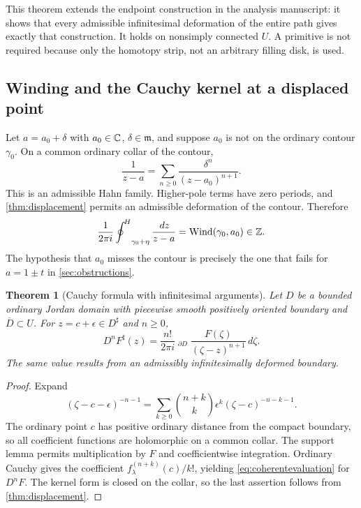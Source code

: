 \documentclass[11pt,letterpaper]{article}
\newtheorem{theorem}{Theorem}[section]
\theoremstyle{definition}
\theoremstyle{remark}
\newcommand{\m}{\mathfrak m}\newcommand{\st}{\operatorname{st}}
\newcommand{\HCoint}{\mathop{\oint^{\!H}}\nolimits}
\newcommand{\sh}{^{\sharp}}\newcommand{\dd}{\,d}
\numberwithin{equation}{section}
\begin{document}
This theorem extends the endpoint construction in the analysis manuscript: it shows that every admissible infinitesimal deformation of the entire path gives exactly that construction. It holds on nonsimply connected $U$. A primitive is not required because only the homotopy strip, not an arbitrary filling disk, is used.

\subsection{Winding and the Cauchy kernel at a displaced point}
Let $a=a_0+\delta$ with $a_0\in\mathbb C$, $\delta\in\m$, and suppose $a_0$ is not on the ordinary contour $\gamma_0$. On a common ordinary collar of the contour,
\[
 \frac1{z-a}=\sum_{n\ge0}\frac{\delta^n}{(z-a_0)^{n+1}}.
\]
This is an admissible Hahn family. Higher-pole terms have zero periods, and \cref{thm:displacement} permits an admissible deformation of the contour. Therefore
\begin{equation}\label{eq:wind}
 \frac1{2\pi i}\HCoint_{\gamma_0+\eta}\frac{\dd z}{z-a}
 =\Wind(\gamma_0,a_0)\in\Z.
\end{equation}
The hypothesis that $a_0$ misses the contour is precisely the one that fails for $a=1\pm t$ in \cref{sec:obstructions}.

\begin{theorem}[Cauchy formula with infinitesimal arguments]\label{thm:cauchyformula}
Let $D$ be a bounded ordinary Jordan domain with piecewise smooth positively oriented boundary and $\overline D\subset U$. For $z=c+\epsilon\in D\sh$ and $n\ge0$,
\begin{equation}\label{eq:cauchyformula}
 D^nF\sh(z)=\frac{n!}{2\pi i}
 \HCoint_{\partial D}\frac{F(\zeta)}{(\zeta-z)^{n+1}}\dd\zeta.
\end{equation}
The same value results from an admissibly infinitesimally deformed boundary.
\end{theorem}
\begin{proof}
Expand
\[
 (\zeta-c-\epsilon)^{-n-1}
 =\sum_{k\ge0}\binom{n+k}{k}
 \epsilon^k(\zeta-c)^{-n-k-1}.
\]
The ordinary point $c$ has positive ordinary distance from the compact boundary, so all coefficient functions are holomorphic on a common collar. The support lemma permits multiplication by $F$ and coefficientwise integration. Ordinary Cauchy gives the coefficient
$f_\lambda^{(n+k)}(c)/k!$, yielding \eqref{eq:coherentevaluation} for $D^nF$. The kernel form is closed on the collar, so the last assertion follows from \cref{thm:displacement}.
\end{proof}
\end{document}
